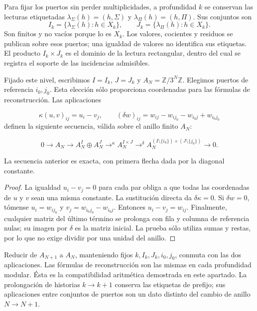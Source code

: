 Para fijar los puertos sin perder multiplicidades, a profundidad \(k\) se conservan las lecturas etiquetadas \(\lambda_\Sigma(h)=(h,\Sigma)\) y \(\lambda_\Pi(h)=(h,\Pi)\). Sus conjuntos son
\[
I_k=\{\lambda_\Sigma(h):h\in X_k\},\qquad
J_k=\{\lambda_\Pi(h):h\in X_k\}.
\]
Son finitos y no vacíos porque lo es \(X_k\). Los valores, cocientes y residuos se publican sobre esos puertos; una igualdad de valores no identifica sus etiquetas. El producto \(I_k\times J_k\) es el dominio de la lectura rectangular, dentro del cual se registra el soporte de las incidencias admisibles.

Fijado este nivel, escribimos \(I=I_k\), \(J=J_k\) y \(A_N=\mathbb Z/3^N\mathbb Z\). Elegimos puertos de referencia \(i_0,j_0\). Esta elección sólo proporciona coordenadas para las fórmulas de reconstrucción. Las aplicaciones

\[
\kappa(u,v)_{ij}=u_i-v_j,
\qquad
(\delta w)_{ij}=w_{ij}-w_{ij_0}-w_{i_0j}+w_{i_0j_0}
\]
definen la siguiente secuencia, válida sobre el anillo finito \(A_N\):

\[
0\longrightarrow A_N\longrightarrow
A_N^I\oplus A_N^J\mathrel{\mathop{\longrightarrow}^{\kappa}}
A_N^{I\times J}\mathrel{\mathop{\longrightarrow}^{\delta}}
A_N^{(I\setminus\{i_0\})\times(J\setminus\{j_0\})}
\longrightarrow0.
\]
\begin{proposition}
\label{x_reciprocidad:iv:cont:rectangular-exacta}
La secuencia anterior es exacta, con primera flecha dada por la diagonal constante.

\end{proposition}
\begin{proof}
La igualdad \(u_i-v_j=0\) para cada par obliga a que todas las coordenadas de \(u\) y \(v\) sean una misma constante. La sustitución directa da \(\delta\kappa=0\). Si \(\delta w=0\), tómense \(u_i=w_{ij_0}\) y \(v_j=w_{i_0j_0}-w_{i_0j}\). Entonces \(u_i-v_j=w_{ij}\). Finalmente, cualquier matriz del último término se prolonga con fila y columna de referencia nulas; su imagen por \(\delta\) es la matriz inicial. La prueba sólo utiliza sumas y restas, por lo que no exige dividir por una unidad del anillo.
\end{proof}

Reducir de \(A_{N+1}\) a \(A_N\), manteniendo fijos \(k,I_k,J_k,i_0,j_0\), conmuta con las dos aplicaciones. Las fórmulas de reconstrucción son las mismas en cada profundidad modular. Ésta es la compatibilidad aritmética demostrada en este apartado. La prolongación de historias \(k\to k+1\) conserva las etiquetas de prefijo; sus aplicaciones entre conjuntos de puertos son un dato distinto del cambio de anillo \(N\to N+1\).

